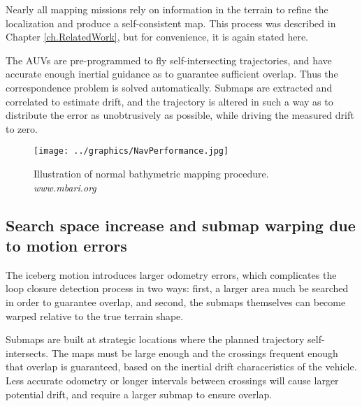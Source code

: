 Nearly all mapping missions rely on information in the terrain to refine the localization and produce a self-consistent map. This process was described in Chapter \ref{ch.RelatedWork}, but for convenience, it is again stated here.

The AUVs are pre-programmed to fly self-intersecting trajectories, and have accurate enough inertial guidance as to guarantee sufficient overlap. Thus the correspondence problem is solved automatically. Submaps are extracted and correlated to estimate drift, and the trajectory is altered in such a way as to distribute the error as unobtrusively as possible, while driving the measured drift to zero.

 \begin{figure}[htbp]
   \centering
   \texttt{[image: ../graphics/NavPerformance.jpg]} %
   \caption{Illustration of normal bathymetric mapping procedure. \emph{www.mbari.org} }
   \label{fig:BathyMapping2}
\end{figure}



\subsection{Search space increase and submap warping due to motion errors}

The iceberg motion introduces larger odometry errors, which complicates the loop closure detection process in two ways: first, a larger area much be searched in order to guarantee overlap, and second, the submaps themselves can become warped relative to the true terrain shape.


Submaps are built at strategic locations where the planned trajectory self-intersects. The maps must be large enough and the crossings frequent enough that overlap is guaranteed, based on the inertial drift characeristics of the vehicle. Less accurate odometry or longer intervals between crossings will cause larger potential drift, and require a larger submap to ensure overlap. 

